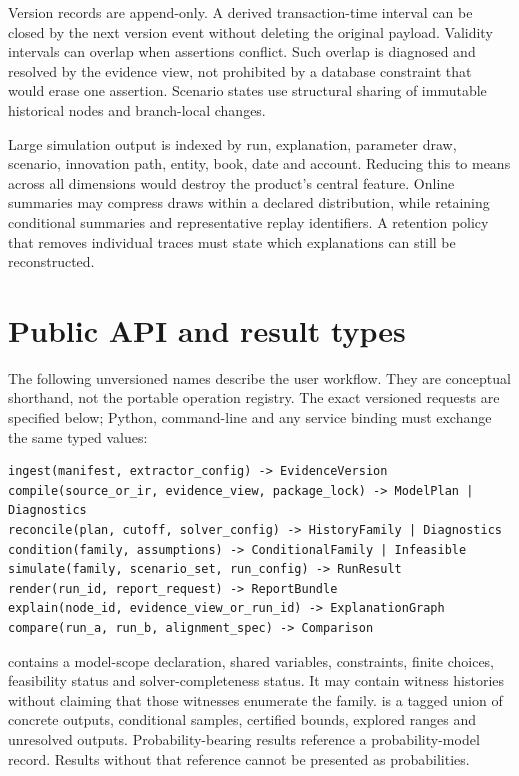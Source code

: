 Version records are append-only. A derived transaction-time interval can be
closed by the next version event without deleting the original payload.
Validity intervals can overlap when assertions conflict. Such overlap is
diagnosed and resolved by the evidence view, not prohibited by a database
constraint that would erase one assertion. Scenario states use structural
sharing of immutable historical nodes and branch-local changes.

Large simulation output is indexed by run, explanation, parameter draw,
scenario, innovation path, entity, book, date and account. Reducing this to
means across all dimensions would destroy the product's central feature.
Online summaries may compress draws within a declared distribution, while
retaining conditional summaries and representative replay identifiers. A
retention policy that removes individual traces must state which explanations
can still be reconstructed.

\begin{minipage}{\linewidth}
\section{Public API and result types}

The following unversioned names describe the user workflow. They are conceptual
shorthand, not the portable operation registry. The exact versioned requests
are specified below; Python, command-line and any service binding must exchange
the same typed values:
\begin{lstlisting}
ingest(manifest, extractor_config) -> EvidenceVersion
compile(source_or_ir, evidence_view, package_lock) -> ModelPlan | Diagnostics
reconcile(plan, cutoff, solver_config) -> HistoryFamily | Diagnostics
condition(family, assumptions) -> ConditionalFamily | Infeasible
simulate(family, scenario_set, run_config) -> RunResult
render(run_id, report_request) -> ReportBundle
explain(node_id, evidence_view_or_run_id) -> ExplanationGraph
compare(run_a, run_b, alignment_spec) -> Comparison
\end{lstlisting}
\end{minipage}

 contains a model-scope declaration, shared variables,
constraints, finite choices, feasibility status and solver-completeness status.
It may contain witness histories without claiming that those witnesses
enumerate the family.  is a tagged union of concrete outputs,
conditional samples, certified bounds, explored ranges and unresolved outputs.
Probability-bearing results reference a probability-model record. Results
without that reference cannot be presented as probabilities.

